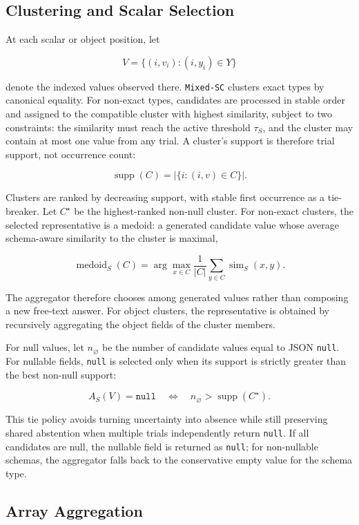 \subsection{Clustering and Scalar Selection}

At each scalar or object position, let

\[
V=\{(i,v_i):(i,y_i)\in Y\}
\]

denote the indexed values observed there. \texttt{Mixed-SC} clusters exact types by canonical equality. For non-exact types, candidates are processed in stable order and assigned to the compatible cluster with highest similarity, subject to two constraints: the similarity must reach the active threshold \(\tau_S\), and the cluster may contain at most one value from any trial. A cluster's support is therefore trial support, not occurrence count:

\[
\operatorname{supp}(C)=|\{i:(i,v)\in C\}|.
\]

Clusters are ranked by decreasing support, with stable first occurrence as a tie-breaker. Let \(C^\star\) be the highest-ranked non-null cluster. For non-exact clusters, the selected representative is a medoid: a generated candidate value whose average schema-aware similarity to the cluster is maximal,

\[
\operatorname{medoid}_S(C)=
\arg\max_{x\in C}
\frac{1}{|C|}\sum_{y\in C}\operatorname{sim}_S(x,y).
\]

The aggregator therefore chooses among generated values rather than composing a new free-text answer. For object clusters, the representative is obtained by recursively aggregating the object fields of the cluster members.

For null values, let \(n_{\varnothing}\) be the number of candidate values equal to JSON \texttt{null}. For nullable fields, \texttt{null} is selected only when its support is strictly greater than the best non-null support:

\[
A_S(V)=\texttt{null}
\quad\Longleftrightarrow\quad
n_{\varnothing}>\operatorname{supp}(C^\star).
\]

This tie policy avoids turning uncertainty into absence while still preserving shared abstention when multiple trials independently return \texttt{null}. If all candidates are null, the nullable field is returned as \texttt{null}; for non-nullable schemas, the aggregator falls back to the conservative empty value for the schema type.

\subsection{Array Aggregation}

